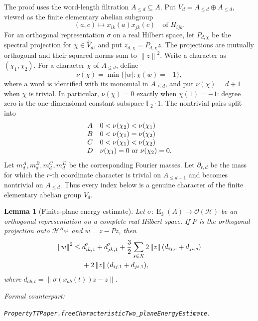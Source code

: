 \documentclass[11pt]{amsart}
\newif\ifanonymous\anonymoustrue
\newcommand{\leanrepo}{[repository link removed for anonymous review]}
\newcommand{\leanrepo}{https://github.com/SauersML/group-approximation}
\newcommand{\leanverified}[2]{%
  \par\smallskip\noindent
  {\normalfont\footnotesize\color{gray!70!black}%
  Formal counterpart:\par\nobreak\noindent
  \ifanonymous\nolinkurl{#2}\else
  \href{\leanrepo/blob/main/GroupApproximation/#1.lean}{\nolinkurl{#2}}\fi.}}
\newtheorem{lemma}[theorem]{Lemma}
\theoremstyle{definition}
\theoremstyle{plain}
\newcommand{\F}{\mathbb F}
\newcommand{\EL}{\operatorname{E}}
\newcommand{\norm}[1]{\left\lVert#1\right\rVert}
\begin{document}
The proof uses the word-length filtration
\(A_{\le d}\subseteq A\).  Put
\(V_d=A_{\le d}\oplus A_{\le d}\), viewed as the finite elementary
abelian subgroup
\[
 (a,c)\longmapsto x_{ik}(a)x_{jk}(c)
 \quad\text{of }H_{ijk}.
\]
For an orthogonal representation \(\sigma\) on a real Hilbert space,
let \(P_{d,\chi}\) be the spectral projection for
\(\chi\in\widehat V_d\), and put \(z_{d,\chi}=P_{d,\chi}z\).
The projections are mutually orthogonal and their squared norms sum to
\(\norm z^2\).  Write a character as \((\chi_1,\chi_2)\).  For a
character \(\chi\) of \(A_{\le d}\), define
\[
 \nu(\chi)=\min\{\lvert w\rvert:\chi(w)=-1\},
\]
where a word is identified with its monomial in \(A_{\le d}\), and
put \(\nu(\chi)=d+1\) when \(\chi\) is trivial.  In particular,
\(\nu(\chi)=0\) exactly when \(\chi(1)=-1\): degree zero is the
one-dimensional constant subspace \(\F_2\cdot1\).  The nontrivial
pairs split into
\[
 \begin{array}{c@{\quad}l}
 A&0<\nu(\chi_2)<\nu(\chi_1)\\
 B&0<\nu(\chi_1)=\nu(\chi_2)\\
 C&0<\nu(\chi_1)<\nu(\chi_2)\\
 D&\nu(\chi_1)=0\ \text{or}\ \nu(\chi_2)=0.
 \end{array}
\]
Let \(m_d^A,m_d^B,m_d^C,m_d^D\) be the corresponding Fourier
masses.  Let \(\partial_{r,d}\) be the mass for which the \(r\)-th
coordinate character is trivial on \(A_{\le d-1}\) and becomes
nontrivial on \(A_{\le d}\).  Thus every index below is a genuine
character of the finite elementary abelian group \(V_d\).

\begin{lemma}[Finite-plane energy estimate]\label{lem:plane-energy}
Let \(\sigma:\EL_3(A)\to\mathcal O(\mathcal H)\) be an orthogonal
representation on a complete real Hilbert space.  If \(P\) is the
orthogonal projection onto
\(\mathcal H^{H_{ijk}}\) and \(w=z-Pz\), then
\begin{align}\label{eq:plane-energy}
 \norm w^2\le{}&d_{ik,1}^2+d_{jk,1}^2
 +\frac32\sum_{s\in X}2\norm z
       (d_{ij,s}+d_{ji,s})\notag\\
 &+2\norm z(d_{ij,1}+d_{ji,1}),
\end{align}
where \(d_{ab,t}=\norm{\sigma(x_{ab}(t))z-z}\).
\leanverified{PropertyTT/PaperStatements}{PropertyTTPaper.freeCharacteristicTwo_planeEnergyEstimate}
\end{lemma}
\end{document}
